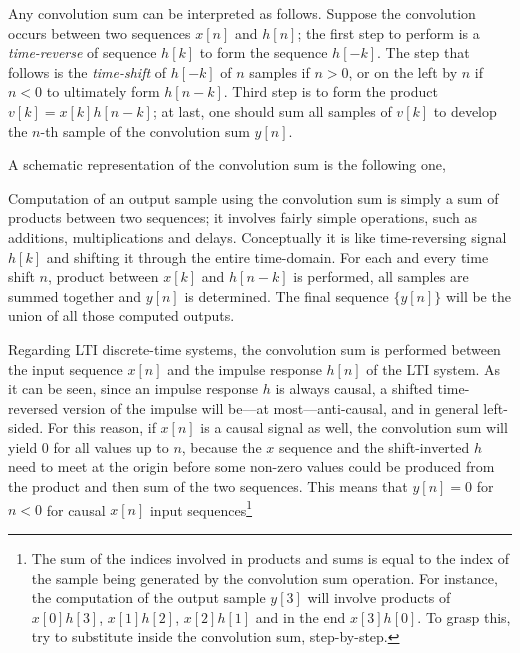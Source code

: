 \documentclass[\documentfontsize, twocolumn]{\classname}
\begin{document}
Any convolution sum can be interpreted as follows. Suppose the convolution occurs between two sequences $x[n]$ and $h[n]$; the first step to perform is a \emph{time-reverse} of sequence $h[k]$ to form the sequence $h[-k]$. The step that follows is the \emph{time-shift} of $h[-k]$ of $n$ samples if $n > 0$, or on the left by $n$ if $n<0$ to ultimately form $h[n-k]$. Third step is to form the product $v[k] = x[k]h[n-k]$; at last, one should sum all samples of $v[k]$ to develop the $n$-th sample of the convolution sum $y[n]$.

A schematic representation of the convolution sum is the following one,
\begin{center}
\end{center}

Computation of an output sample using the convolution sum is simply a sum of products between two sequences; it involves fairly simple operations, such as additions, multiplications and delays. Conceptually it is like time-reversing signal $h[k]$ and shifting it through the entire time-domain. For each and every time shift $n$, product between $x[k]$ and $h[n-k]$ is performed, all samples are summed together and $y[n]$ is determined. The final sequence $\{y[n]\}$ will be the union of all those computed outputs.

Regarding LTI discrete-time systems, the convolution sum is performed between the input sequence $x[n]$ and the impulse response $h[n]$ of the LTI system. As it can be seen, since an impulse response $h$ is always causal, a shifted time-reversed version of the impulse will be---at most---anti-causal, and in general left-sided. For this reason, if $x[n]$ is a causal signal as well, the convolution sum will yield $0$ for all values up to $n$, because the $x$ sequence and the shift-inverted $h$ need to meet at the origin before some non-zero values could be produced from the product and then sum of the two sequences. This means that $y[n]=0$ for $n<0$ for causal $x[n]$ input sequences\footnote{The sum of the indices involved in products and sums is equal to the index of the sample being generated by the convolution sum operation. For instance, the computation of the output sample $y[3]$ will involve products of $x[0]h[3]$, $x[1]h[2]$, $x[2]h[1]$ and in the end $x[3]h[0]$. To grasp this, try to substitute inside the convolution sum, step-by-step.}
\end{document}

